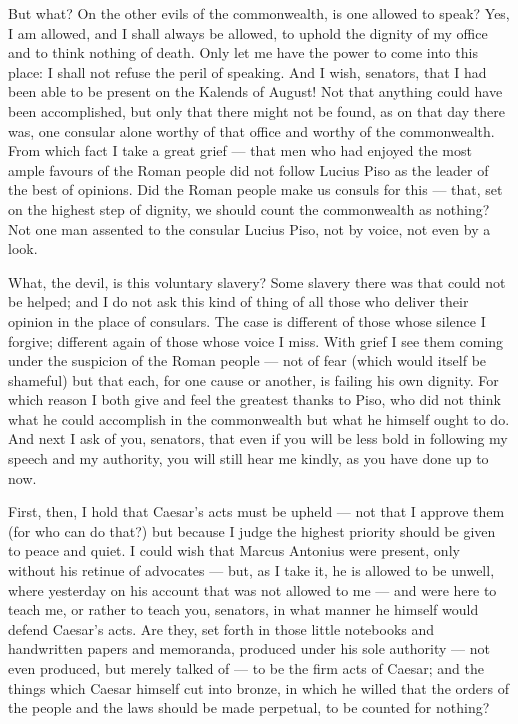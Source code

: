  But what? On the other evils of the commonwealth, is one allowed to speak? Yes, I am allowed, and I shall always be allowed, to uphold the dignity of my office and to think nothing of death. Only let me have the power to come into this place: I shall not refuse the peril of speaking. And I wish, senators, that I had been able to be present on the Kalends of August! Not that anything could have been accomplished, but only that there might not be found, as on that day there was, one consular alone worthy of that office and worthy of the commonwealth. From which fact I take a great grief --- that men who had enjoyed the most ample favours of the Roman people did not follow Lucius Piso as the leader of the best of opinions. Did the Roman people make us consuls for this --- that, set on the highest step of dignity, we should count the commonwealth as nothing? Not one man assented to the consular Lucius Piso, not by voice, not even by a look.

 What, the devil, is this voluntary slavery? Some slavery there was that could not be helped; and I do not ask this kind of thing of all those who deliver their opinion in the place of consulars. The case is different of those whose silence I forgive; different again of those whose voice I miss. With grief I see them coming under the suspicion of the Roman people --- not of fear (which would itself be shameful) but that each, for one cause or another, is failing his own dignity. For which reason I both give and feel the greatest thanks to Piso, who did not think what he could accomplish in the commonwealth but what he himself ought to do. And next I ask of you, senators, that even if you will be less bold in following my speech and my authority, you will still hear me kindly, as you have done up to now.

 First, then, I hold that Caesar's acts must be upheld --- not that I approve them (for who can do that?) but because I judge the highest priority should be given to peace and quiet. I could wish that Marcus Antonius were present, only without his retinue of advocates --- but, as I take it, he is allowed to be unwell, where yesterday on his account that was not allowed to me --- and were here to teach me, or rather to teach you, senators, in what manner he himself would defend Caesar's acts. Are they, set forth in those little notebooks and handwritten papers and memoranda, produced under his sole authority --- not even produced, but merely talked of --- to be the firm acts of Caesar; and the things which Caesar himself cut into bronze, in which he willed that the orders of the people and the laws should be made perpetual, to be counted for nothing?

